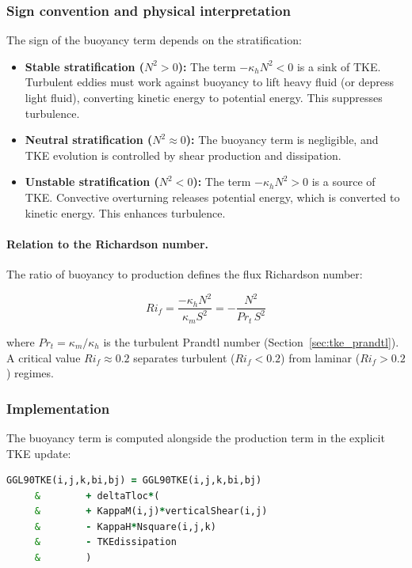 \documentclass[12pt,letterpaper]{article}
\begin{document}
\subsubsection{Sign convention and physical interpretation}

The sign of the buoyancy term depends on the stratification:

\begin{itemize}
\item \textbf{Stable stratification ($N^2 > 0$):} The term $-\kappa_h N^2 < 0$ is a sink of TKE. Turbulent eddies must work against buoyancy to lift heavy fluid (or depress light fluid), converting kinetic energy to potential energy. This suppresses turbulence.

\item \textbf{Neutral stratification ($N^2 \approx 0$):} The buoyancy term is negligible, and TKE evolution is controlled by shear production and dissipation.

\item \textbf{Unstable stratification ($N^2 < 0$):} The term $-\kappa_h N^2 > 0$ is a source of TKE. Convective overturning releases potential energy, which is converted to kinetic energy. This enhances turbulence.
\end{itemize}

\paragraph{Relation to the Richardson number.} The ratio of buoyancy to production defines the flux Richardson number:

\begin{equation}
Ri_f = \frac{-\kappa_h N^2}{\kappa_m S^2} = -\frac{N^2}{Pr_t \, S^2}
\end{equation}

where $Pr_t = \kappa_m / \kappa_h$ is the turbulent Prandtl number (Section~\ref{sec:tke_prandtl}). A critical value $Ri_f \approx 0.2$ separates turbulent ($Ri_f < 0.2$) from laminar ($Ri_f > 0.2$) regimes.

\subsubsection{Implementation}

The buoyancy term is computed alongside the production term in the explicit TKE update:

\begin{lstlisting}[language=Fortran,caption={(ggl90\_calc.F:L605--610) Explicit TKE budget update: buoyancy term}]
         GGL90TKE(i,j,k,bi,bj) = GGL90TKE(i,j,k,bi,bj)
     &        + deltaTloc*(
     &        + KappaM(i,j)*verticalShear(i,j)
     &        - KappaH*Nsquare(i,j,k)
     &        - TKEdissipation
     &        )
\end{lstlisting}
\end{document}
